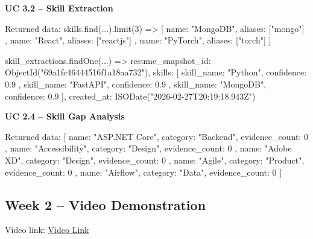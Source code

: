 \documentclass[11pt]{article}
\begin{document}
\noindent
\textbf{UC 3.2 -- Skill Extraction}
\begin{TerminalBlock}
Returned data:
skills.find(...).limit(3) =>
[
  { name: "MongoDB", aliases: ["mongo"] },
  { name: "React", aliases: ["reactjs"] },
  { name: "PyTorch", aliases: ["torch"] }
]

skill_extractions.findOne(...) =>
{
  resume_snapshot_id: ObjectId("69a1fc46444516f1a18aa732"),
  skills: [
    { skill_name: "Python", confidence: 0.9 },
    { skill_name: "FastAPI", confidence: 0.9 },
    { skill_name: "MongoDB", confidence: 0.9 }
  ],
  created_at: ISODate("2026-02-27T20:19:18.943Z")
}
\end{TerminalBlock}

\noindent
\textbf{UC 2.4 -- Skill Gap Analysis}
\begin{TerminalBlock}
Returned data:
[
  { name: "ASP.NET Core", category: "Backend", evidence_count: 0 },
  { name: "Accessibility", category: "Design", evidence_count: 0 },
  { name: "Adobe XD", category: "Design", evidence_count: 0 },
  { name: "Agile", category: "Product", evidence_count: 0 },
  { name: "Airflow", category: "Data", evidence_count: 0 }
]
\end{TerminalBlock}

\subsection*{Week 2 -- Video Demonstration}
\noindent
Video link: \href{https://drive.google.com/file/d/1VNMVQtzIe4HL9UoQhuhnphgiitfG7b9m/view?usp=drive_link}{Video Link}
\end{document}
